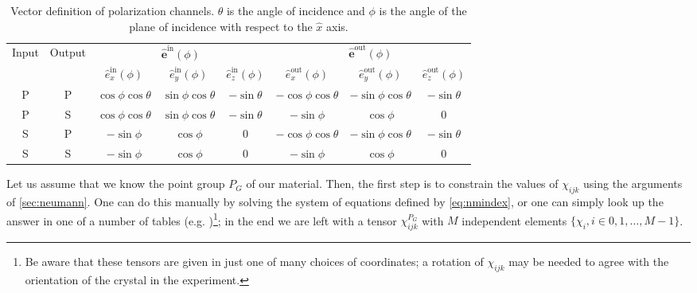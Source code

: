 \begin{landscape}
\begin{table}
\renewcommand{\arraystretch}{1.1}
\caption[Vector definition of polarization channels.]{\label{tab:polarizations}Vector definition of polarization channels. $\theta$ is the angle of incidence and $\phi$ is the angle of the plane of incidence with respect to the $\hat{x}$ axis.}
\begin{tabular}{|c c|c c c|c c c|}
\hline
\multirow{2}{*}{Input} & \multirow{2}{*}{Output} & \multicolumn{3}{|c|}{$\hat{\bm{e}}^\mathrm{in}(\phi)$} & \multicolumn{3}{|c|}{$\hat{\bm{e}}^\mathrm{out}(\phi)$}\\
& & $\hat{e}^\mathrm{in}_x(\phi)$ & $\hat{e}^\mathrm{in}_y(\phi)$ & $\hat{e}^\mathrm{in}_z(\phi)$ & $\hat{e}^\mathrm{out}_x(\phi)$ & $\hat{e}^\mathrm{out}_y(\phi)$ & $\hat{e}^\mathrm{out}_z(\phi)$\\
\hline
P & P & $\cos\phi\cos\theta$ & $\sin\phi\cos\theta$ & $-\sin\theta$ & $-\cos\phi\cos\theta$ & $-\sin\phi\cos\theta$ & $-\sin\theta$\\
P & S & $\cos\phi\cos\theta$ & $\sin\phi\cos\theta$ & $-\sin\theta$ & $-\sin\phi$ & $\cos\phi$ & $0$\\
S & P & $-\sin\phi$ & $\cos\phi$ & $0$ & $-\cos\phi\cos\theta$ & $-\sin\phi\cos\theta$ & $-\sin\theta$\\
S & S & $-\sin\phi$ & $\cos\phi$ & $0$ & $-\sin\phi$ & $\cos\phi$ & $0$\\
\hline
\end{tabular}
\end{table}
\end{landscape}

Let us assume that we know the point group $P_G$ of our material.
Then, the first step is to constrain the values of $\chi_{ijk}$ using the arguments of \cref{sec:neumann}.
One can do this manually by solving the system of equations defined by \cref{eq:nmindex}, or one can simply look up the answer in one of a number of tables (e.g. \citet{boyd})\footnote{Be aware that these tensors are given in just one of many choices of coordinates; a rotation of $\chi_{ijk}$ may be needed to agree with the orientation of the crystal in the experiment.}; in the end we are left with a tensor $\chi_{ijk}^{P_G}$ with $M$ independent elements $\{\chi_i, i\in 0, 1, \ldots, M-1\}$.

